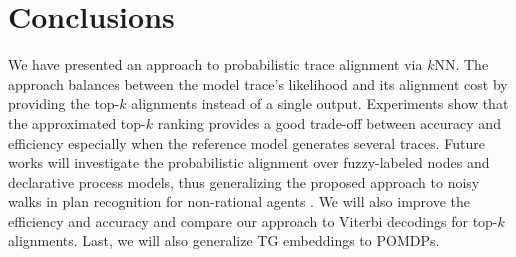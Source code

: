 
\section{Conclusions}
\label{sec:conclusion}

We have presented an approach to probabilistic trace alignment via $k$NN.
The approach balances between the model trace's likelihood  and its alignment cost by providing the top-$k$ 
alignments instead of a single output. Experiments show that the approximated top-$k$ ranking provides a good 
trade-off between accuracy and efficiency especially when the reference model generates several traces.
Future works will investigate the probabilistic alignment over fuzzy-labeled nodes and declarative process models, thus 
generalizing the proposed approach to noisy walks in plan recognition for non-rational agents \cite{RamirezG10}. We will also improve 
the efficiency and accuracy and compare our approach to %
  Viterbi decodings for top-$k$ alignments. Last, we will also 
generalize TG embeddings to  POMDPs.

